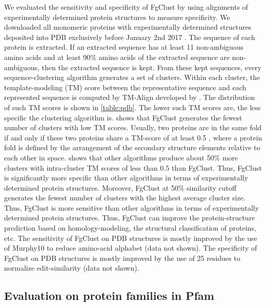 \documentclass[11pt,letterpaper]{article}
\begin{document}
We evaluated the sensitivity and specificity of FgClust by using alignments of experimentally determined protein structures to measure specificity.
We downloaded all monomeric proteins with experimentally determined structures deposited into PDB exclusively before January 2nd 2017 \citep{berman2006protein}.
The sequence of each protein is extracted.
If an extracted sequence has at least 11 non-ambiguous amino acids and at least 90\% amino acids of the extracted sequence are non-ambiguous, then the extracted sequence is kept.
From these kept sequences, every sequence-clustering algorithm generates a set of clusters.
Within each cluster, the template-modeling (TM) score between the representative sequence and each represented sequence is computed by TM-Align developed by \citet{zhang2005tm}.
The distribution of such TM scores is shown in \cref{table:pdb}.
The lower such TM scores are, the less specific the clustering algorithm is.
 shows that FgClust generates the fewest number of clusters with low TM scores.
Usually, two proteins are in the same fold if and only if these two proteins share a TM-score of at least 0.5 \citep{xu2010significant}, where a protein fold is defined by the arrangement of the secondary structure elements relative to each other in space.
 shows that other algorithms produce about 50\% more clusters with intra-cluster TM scores of less than 0.5 than FgClust.
Thus, FgClust is significantly more specific than other algorithms in terms of experimentally determined protein structures.
Moreover, FgClust at 50\% similarity cutoff generates the fewest number of clusters with the highest average cluster size.
Thus, FgClust is more sensitive than other algorithms in terms of experimentally determined protein structures.
Thus, FgClust can improve the protein-structure prediction based on homology-modeling, the structural classification of proteins, etc.
The sensitivity of FgClust on PDB structures is mostly improved by the use of Murphy10 to reduce amino-acid alphabet (data not shown).
The specificity of FgClust on PDB structures is mostly improved by the use of 25 residues to normalize edit-similarity (data not shown).

\subsection{Evaluation on protein families in Pfam}
\end{document}
